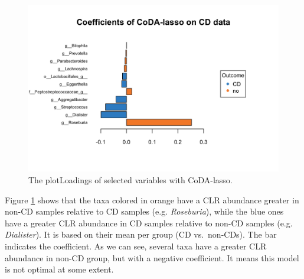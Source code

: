 \documentclass[openany]{book}
\newenvironment{Shaded}{\begin{snugshade}}{\end{snugshade}}
\newcommand{\KeywordTok}[1]{\textcolor[rgb]{0.13,0.29,0.53}{\textbf{#1}}}
\newcommand{\DataTypeTok}[1]{\textcolor[rgb]{0.13,0.29,0.53}{#1}}
\newcommand{\StringTok}[1]{\textcolor[rgb]{0.31,0.60,0.02}{#1}}
\newcommand{\CommentTok}[1]{\textcolor[rgb]{0.56,0.35,0.01}{\textit{#1}}}
\newcommand{\OperatorTok}[1]{\textcolor[rgb]{0.81,0.36,0.00}{\textbf{#1}}}
\newcommand{\NormalTok}[1]{#1}
\begin{document}
\begin{Shaded}
\end{Shaded}

\begin{figure}

{\centering \includegraphics[width=1\linewidth]{./Generated_plots/loadcodaCD-1} 

}

\caption{The plotLoadings of selected variables with CoDA-lasso.}\label{fig:loadcodaCD}
\end{figure}

Figure \ref{fig:loadcodaCD} shows that the taxa colored in orange have a
CLR abundance greater in non-CD samples relative to CD samples (e.g.
\emph{Roseburia}), while the blue ones have a greater CLR abundance in
CD samples relative to non-CD samples (e.g. \emph{Dialister}). It is
based on their mean per group (CD vs.~non-CDs). The bar indicates the
coefficient. As we can see, several taxa have a greater CLR abundance in
non-CD group, but with a negative coefficient. It means this model is
not optimal at some extent.
\end{document}

